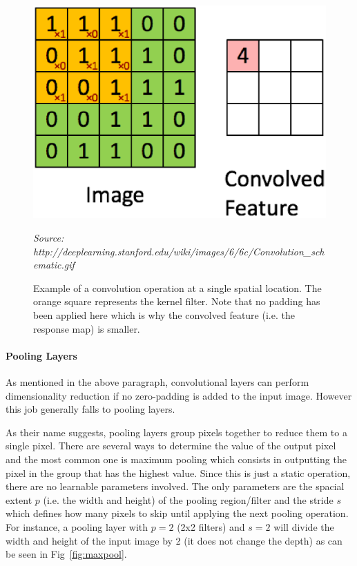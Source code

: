 \documentclass[12pt,twoside]{article}
\newcommand{\source}[1]{\vspace{-3pt} \caption*{ \footnotesize{\textit{Source: {#1}}}} }
\begin{document}
\begin{figure}[ht]
  \centering
  \includegraphics[scale=0.5]{./figures/convolution_example.eps}
  \caption{Example of a convolution operation at a single spatial location. The
  orange square represents the kernel filter. Note that no padding has been
applied here which is why the convolved feature (i.e. the response map) is
smaller.}
  \source{http://deeplearning.stanford.edu/wiki/images/6/6c/Convolution\_schematic.gif}
  \label{fig:conv_op}
\end{figure}

\paragraph{Pooling Layers}  

As mentioned in the above paragraph, convolutional layers can perform
dimensionality reduction if no zero-padding is added to the input image.
However this job generally falls to pooling layers.

As their name suggests, pooling layers group pixels together to reduce them to a
single pixel. There are several ways to determine the value of the output pixel
and the most common one is maximum pooling which consists in outputting the
pixel in the group that has the highest value. Since this is just a static
operation, there are no learnable parameters involved. The only parameters are
the spacial extent $p$ (i.e. the width and height) of the pooling region/filter and
the stride $s$ which defines how many pixels to skip until applying the next
pooling operation. For instance, a pooling layer with $p=2$ (2x2 filters) and
$s=2$ will divide the width and height of the input image by 2 (it does not
change the depth) as can be seen in Fig~\ref{fig:maxpool}.
\end{document}
